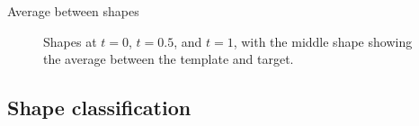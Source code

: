 \documentclass{beamer}
\begin{document}
\begin{frame}{Average between shapes}
\begin{figure}[h!]
  \centering
  \caption{Shapes at $t=0$, $t=0.5$, and $t=1$, with the middle shape
    showing the average between the template and target.}
\label{fig:average}
\end{figure}  
\end{frame}

\subsection{Shape classification}
\end{document}
